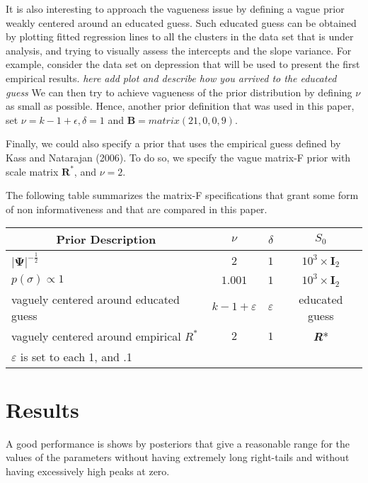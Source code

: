 \documentclass[a4paper]{article}
\begin{document}
\begin{itemize}
It is also interesting to approach the vagueness issue by defining
a vague prior weakly centered around an educated guess. Such educated
guess can be obtained by plotting fitted regression lines to all
the clusters in the data set that is under analysis, and trying to
visually assess the intercepts and the slope variance. For example,
consider the data set on depression that will be used to present
the first empirical results. \textit{here add plot and describe how
you arrived to the educated guess}
We can then try to achieve vagueness of the prior distribution by
defining $\nu$ as small as possible. Hence, another prior definition
that was used in this paper, set $\nu = k - 1 + \epsilon, \delta =
1$ and $\bm{B} = matrix(21, 0, 0, 9)$.

Finally, we could also specify a prior that uses the empirical
guess defined by Kass and Natarajan (2006). To do so, we specify
the vague matrix-F prior with scale matrix $\bm{R}^*$, and $\nu 
= 2$.

The following table summarizes the matrix-F specifications that
grant some form of non informativeness and that are compared in 
this paper.

\begin{center}
\begin{tabular}{ c c c c }
 Prior Description & $\nu$ & $\delta$ & $S_{0}$ \\ 
 \hline
 \multicolumn{1}{l}{$|\bm{\Psi}|^{-\frac{1}{2}}$} & $2$ & $1$ & $10^3 \times \bm{I}_2$ \\
 \multicolumn{1}{l}{$p(\sigma)\propto1$} & $1.001$ & $1$ & $10^3 \times \bm{I}_2$ \\
 \multicolumn{1}{l}{vaguely centered around educated guess} & $k-1+\varepsilon$ & $\varepsilon$ & educated guess \\
 \multicolumn{1}{l}{vaguely centered around empirical $R^*$} & $2$ & $1$ & \textbf{\textit{R}}* \\ 
 \hline
  \multicolumn{1}{l}{$\varepsilon$ is set to each 1, and .1} 
\end{tabular}
\end{center}

\end{itemize}

\section{Results}

A good performance is shows by posteriors that give a reasonable 
range for the values of the parameters without having extremely
long right-tails and without having excessively high peaks at zero.
\end{document}
